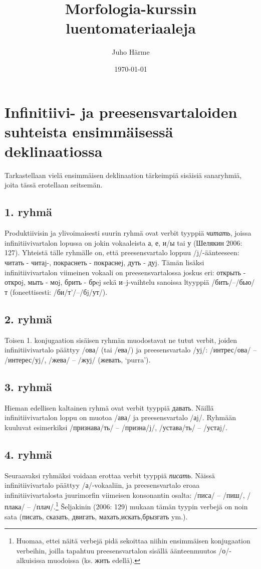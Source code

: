 \documentclass[]{scrartcl}
\author{Juho Härme}
\title{Morfologia-kurssin luentomateriaaleja}
\date{\today}
\begin{document}
\section*{Infinitiivi- ja preesensvartaloiden suhteista ensimmäisessä
deklinaatiossa}\label{infinitiivi--ja-preesensvartaloiden-suhteista-ensimmuxe4isessuxe4-deklinaatiossa}

Tarkastellaan vielä ensimmäisen deklinaation tärkeimpiä sisäisiä
sanaryhmiä, joita tässä erotellaan seitsemän.

\subsection*{1. ryhmä}\label{ryhmuxe4}

Produktiivisin ja ylivoimaisesti suurin ryhmä ovat verbit tyyppiä
\emph{читать}, joissa infinitiivivartalon lopussa on jokin vokaaleista
а, е, и/ы tai у (Шелякин 2006: 127). Yhteistä tälle ryhmälle on, että
preesensvartalo loppuu /j/-äänteeseen: читать - читаj-, покраснеть -
покраснеj, дуть - дуj. Tämän lisäksi infinitiivivartalon viimeinen
vokaali on preesensvartalossa joskus eri: открыть - откроj, мыть - моj,
брить - брej sekä и--j-vaihtelu sanoissa ltyyppiä /бить/--/бью/т
(foneettisesti: /би/т'/--/бj/ут/).

\subsection*{2. ryhmä}\label{ryhmuxe4-1}

Toisen 1. konjugaation sisäisen ryhmän muodostavat ne tutut verbit,
joiden infinitiivivartalo päättyy /ова/ (tai /ева/) ja preesensvartalo
/уj/: /интрес/ова/ -- /интерес/уj/, /жева/ -- /жуj/ (жевать, `purra').

\subsection*{3. ryhmä}\label{ryhmuxe4-2}

Hieman edellisen kaltainen ryhmä ovat verbit tyyppiä давать. Näillä
infinitiivivartalon loppu on muotoa /ава/ ja preesensvartalo /аj/.
Ryhmään kuuluvat esimerkiksi /признава/ть/ -- /призна/j/, /устава/ть/ --
/устаj/.

\subsection*{4. ryhmä}\label{ryhmuxe4-3}

Seuraavaksi ryhmäksi voidaan erottaa verbit tyyppiä \emph{писать}.
Näissä infinitiivivartalo päättyy /а/-vokaaliin, ja preesensvartalo
eroaa infinitiivivartalosta juurimorfin viimeisen konsonantin osalta:
/писа/ -- /пиш/, /плака/ -- /плач/.\footnote{Huomaa, ettei näitä verbejä
  pidä sekoittaa niihin ensimmäisen konjugaation verbeihin, joilla
  tapahtuu preesensvartalon sisällä äänteenmuutos /о/-alkuisissa
  muodoissa (ks. жить edellä).} Šeljakinin (2006: 129) mukaan tämän
tyypin verbejä on noin sata (писать, сказать, двигать,
махать,искать,брызгать ym.).
\end{document}
